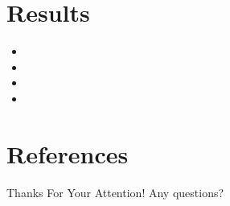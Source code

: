 \documentclass{beamer}
\begin{document}
\section{Results}
\begin{frame}
    \begin{itemize}
        \item \lipsum[4][1-4]
        \item \lipsum[4][5-9]
        \item \lipsum[5][1-4]
        \item \lipsum[5][5-8]
    \end{itemize}
\end{frame}

\section{References}

\begin{frame}[allowframebreaks]
    
    
    \nocite{*} %
\end{frame}


\begin{frame}
    \begin{center}
        {\Huge\calligra Thanks For Your Attention!}
        Any questions?
    \end{center}
\end{frame}
\end{document}
